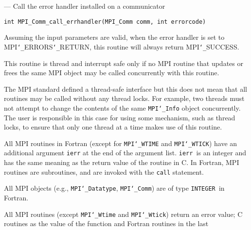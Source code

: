 \startmanpage
{}
--- Call the error handler installed on a  communicator 
\startvb\begin{verbatim}
int MPI_Comm_call_errhandler(MPI_Comm comm, int errorcode)

\end{verbatim}
\endvb

\par
{}
Assuming the input parameters are valid, when the error handler is set to
MPI{\tt \char`\_}ERRORS{\tt \char`\_}RETURN, this routine will always return MPI{\tt \char`\_}SUCCESS.
\par
\par
{}
\par
This routine is thread and interrupt safe only if no MPI routine that
updates or frees the same MPI object may be called concurrently
with this routine.
\par
The MPI standard defined a thread-safe interface but this does not
mean that all routines may be called without any thread locks.  For
example, two threads must not attempt to change the contents of the
same {\tt MPI{\tt \char`\_}Info} object concurrently.  The user is responsible in this
case for using some mechanism, such as thread locks, to ensure that
only one thread at a time makes use of this routine.
\par
\par
{}
All MPI routines in Fortran (except for {\tt MPI{\tt \char`\_}WTIME} and {\tt MPI{\tt \char`\_}WTICK}) have
an additional argument {\tt ierr} at the end of the argument list.  {\tt ierr
}is an integer and has the same meaning as the return value of the routine
in C.  In Fortran, MPI routines are subroutines, and are invoked with the
{\tt call} statement.
\par
All MPI objects (e.g., {\tt MPI{\tt \char`\_}Datatype}, {\tt MPI{\tt \char`\_}Comm}) are of type {\tt INTEGER
}in Fortran.
\par
{}
\par
All MPI routines (except {\tt MPI{\tt \char`\_}Wtime} and {\tt MPI{\tt \char`\_}Wtick}) return an error value;
C routines as the value of the function and Fortran routines in the last
